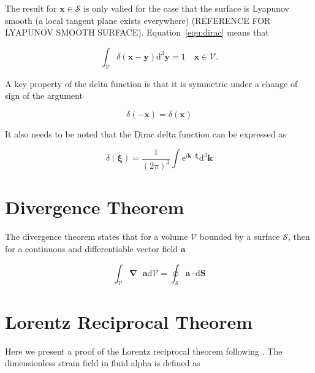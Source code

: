 \documentclass[12pt]{article}
\begin{document}
The result for $\boldsymbol{x} \in \mathcal{S}$ is only valied for the case that the surface is Lyapunov smooth (a local tangent plane exists everywhere) (REFERENCE FOR LYAPUNOV SMOOTH SURFACE). Equation~\ref{equ:dirac} means that

\begin{equation}
\label{equ:delta_int}
\int_{\mathcal{V}} \delta(\boldsymbol{x} - \boldsymbol{y}) \mathrm{d}^{3} \boldsymbol{y} = 1 \quad \boldsymbol{x} \in \mathcal{V}.
\end{equation}

A key property of the delta function is that it is symmetric under a change of sign of the argument

\begin{equation}
\label{equ:delta_sym}
\delta(-\boldsymbol{x}) = \delta(\boldsymbol{x})
\end{equation}

It also needs to be noted that the Dirac delta function can be expressed as \citep{Riley06}

\begin{equation}
\label{equ:delta_int_def}
\delta (\boldsymbol{\xi}) = \frac{1}{(2 \pi)^{3}} \int \mathrm{e}^{i \boldsymbol{k} \cdot \boldsymbol{\xi}} \mathrm{d}^{3} \boldsymbol{k}
\end{equation}


\section{Divergence Theorem}
\label{app:div_theory}

The divergence theorem states that for a volume $\mathcal{V}$ bounded by a surface $\mathcal{S}$, then for a continuous and differentiable vector field $\boldsymbol{a}$ \cite{Riley06}

\begin{equation}
\label{equ:div_theory}
\int_{\mathcal{V}} \boldsymbol{\nabla} \cdot \boldsymbol{a} \mathrm{d} \mathcal{V} = \oint_{\mathcal{S}} \boldsymbol{a} \cdot \mathrm{d} \boldsymbol{S}
\end{equation}

\section{Lorentz Reciprocal Theorem}
\label{app:Lorentz}

Here we present a proof of the Lorentz reciprocal theorem following \citet{Kim05}. The dimensionless strain field in fluid alpha is defined as
\end{document}
